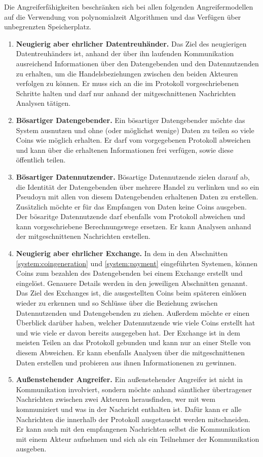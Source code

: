 \documentclass[
	fontsize=12pt,
	headings=small,
	parskip=half,           %
	bibliography=totoc,
	numbers=noenddot,       %
	open=any,               %
]{scrreprt}
\begin{document}
Die Angreiferfähigkeiten beschränken sich bei allen folgenden Angreifermodellen auf die Verwendung von polynomialzeit Algorithmen und das Verfügen über unbegrenzten Speicherplatz.
\begin{enumerate}
    \item \textbf{Neugierig aber ehrlicher Datentreuhänder.} Das Ziel des neugierigen Datentreuhänders ist, anhand der über ihn laufenden Kommunikation ausreichend Informationen über den Datengebenden und den Datennutzenden zu erhalten, um die Handelsbeziehungen zwischen den beiden Akteuren verfolgen zu können. Er muss sich an die im Protokoll vorgeschriebenen Schritte halten und darf nur anhand der mitgeschnittenen Nachrichten Analysen tätigen.
    \item \textbf{Bösartiger Datengebender.} Ein bösartiger Datengebender möchte das System ausnutzen und ohne (oder möglichst wenige) Daten zu teilen so  viele Coins wie möglich erhalten. Er darf vom vorgegebenen Protokoll abweichen und kann über die erhaltenen Informationen frei verfügen, sowie diese öffentlich teilen.
    \item \textbf{Bösartiger Datennutzender.} Bösartige Datennutzende zielen darauf ab, die Identität der Datengebenden über mehrere Handel zu verlinken und so ein Pseudoyn mit allen von diesem Datengebenden erhaltenen Daten zu erstellen. Zusätzlich möchte er für das Empfangen von Daten keine Coins ausgeben. Der bösaritge Datennutzende darf ebenfalls vom Protokoll abweichen und kann vorgeschriebene Berechnungswege ersetzen. Er kann Analysen anhand der mitgeschnittenen Nachrichten erstellen.
    \item \textbf{Neugierig aber ehrlicher Exchange.} In dem in den Abschnitten \ref{system:coingeneration} und \ref{system:payment} eingeführten Systemen, können Coins zum bezahlen des Datengebenden bei einem Exchange erstellt und eingelöst. Genauere Details werden in den jeweiligen Abschnitten genannt. Das Ziel des Exchanges ist, die ausgestellten Coins beim späteren einlösen wieder zu erkennen und so Schlüsse über die Beziehung zwischen Datennutzenden und Datengebenden zu ziehen. Außerdem möchte er einen Überblick darüber haben, welcher Datennutzende wie viele Coins erstellt hat und wie viele er davon bereits ausgegeben hat. Der Exchange ist in dem meisten Teilen an das Protokoll gebunden und kann nur an einer Stelle von diesem Abweichen. Er kann ebenfalls Analysen über die mitgeschnittenen Daten erstellen und probieren aus ihnen Informationenen zu gewinnen.
    \item \textbf{Außenstehender Angreifer.} Ein außenstehender Angreifer ist nicht in Kommunikation involviert, sondern möchte anhand sämtlicher übertragener Nachrichten zwischen zwei Akteuren herausfinden, wer mit wem kommuniziert und was in der Nachricht enthalten ist. Dafür kann er alle Nachrichten die innerhalb der Protokoll ausgetauscht werden mitschneiden. Er kann auch mit den empfangenen Nachrichten selbst die Kommunikation mit einem Akteur aufnehmen und sich als ein Teilnehmer der Kommunikation ausgeben.
\end{enumerate}
\end{document}

